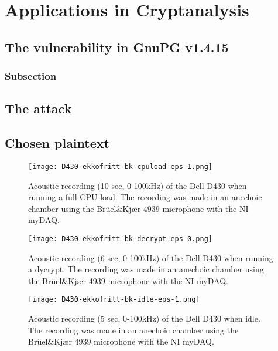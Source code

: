 \chapter{Applications in Cryptanalysis}
\label{chp:application_in_cryptanalysis} 

\section{The vulnerability in GnuPG v1.4.15}\label{sec:vulnerability_gnupg}

\subsection{Subsection}\label{sec:first_ssection}


\section{The attack}\label{sec:attack}


\section{Chosen plaintext}\label{sec:chosen_plaintext}

\begin{wrapfigure}{r}{1\textwidth}
    \centering
    \texttt{[image: D430-ekkofritt-bk-cpuload-eps-1.png]}
    \caption{Acoustic recording (10 sec, 0-100kHz) of the Dell D430 when running a full CPU load. The recording was made in an anechoic chamber using the Brüel\&Kjær 4939 microphone with the NI myDAQ. }
    \label{fig:D430-ekkofritt-bk-cpuload-eps-1}
\end{wrapfigure}

\begin{wrapfigure}{r}{1\textwidth}
    \centering
    \texttt{[image: D430-ekkofritt-bk-decrypt-eps-0.png]}
    \caption{Acoustic recording (6 sec, 0-100kHz) of the Dell D430 when running a dycrypt. The recording was made in an anechoic chamber using the Brüel\&Kjær 4939 microphone with the NI myDAQ. }
    \label{fig:D430-ekkofritt-bk-decrypt-eps-0}
\end{wrapfigure}

\begin{wrapfigure}{r}{1\textwidth}
    \centering
    \texttt{[image: D430-ekkofritt-bk-idle-eps-1.png]}
    \caption{Acoustic recording (5 sec, 0-100kHz) of the Dell D430 when idle. The recording was made in an anechoic chamber using the Brüel\&Kjær 4939 microphone with the NI myDAQ. }
    \label{fig:D430-ekkofritt-bk-idle-eps-1}
\end{wrapfigure}


